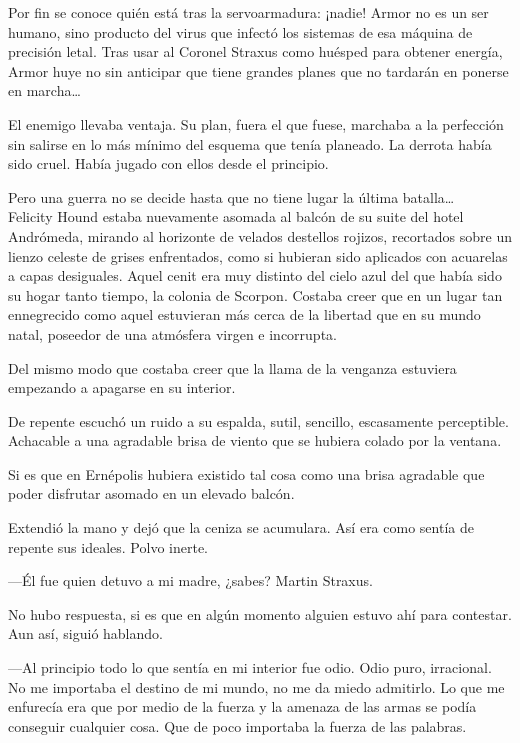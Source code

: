\begin{prev}
    Por fin se conoce quién está tras la servoarmadura: ¡nadie! Armor no es un ser humano, sino producto del virus que infectó los sistemas de esa máquina de precisión letal. Tras usar al Coronel Straxus como huésped para obtener energía, Armor huye no sin anticipar que tiene grandes planes que no tardarán en ponerse en marcha\dots
\end{prev}

\noindent{}El enemigo llevaba ventaja. Su plan, fuera el que fuese, marchaba a la perfección sin salirse en lo más mínimo del esquema que tenía planeado. La derrota había sido cruel. Había jugado con ellos desde el principio.

Pero una guerra no se decide hasta que no tiene lugar la última batalla\dots\\

\noindent{}Felicity Hound estaba nuevamente asomada al balcón de su suite del hotel Andrómeda, mirando al horizonte de velados destellos rojizos, recortados sobre un lienzo celeste de grises enfrentados, como si hubieran sido aplicados con acuarelas a capas desiguales. Aquel cenit era muy distinto del cielo azul del que había sido su hogar tanto tiempo, la colonia de Scorpon. Costaba creer que en un lugar tan ennegrecido como aquel estuvieran más cerca de la libertad que en su mundo natal, poseedor de una atmósfera virgen e incorrupta.

Del mismo modo que costaba creer que la llama de la venganza estuviera empezando a apagarse en su interior.

De repente escuchó un ruido a su espalda, sutil, sencillo, escasamente perceptible. Achacable a una agradable brisa de viento que se hubiera colado por la ventana.

Si es que en Ernépolis hubiera existido tal cosa como una brisa agradable que poder disfrutar asomado en un elevado balcón.

Extendió la mano y dejó que la ceniza se acumulara. Así era como sentía de repente sus ideales. Polvo inerte.

---Él fue quien detuvo a mi madre, ¿sabes? Martin Straxus.

No hubo respuesta, si es que en algún momento alguien estuvo ahí para contestar. Aun así, siguió hablando.

---Al principio todo lo que sentía en mi interior fue odio. Odio puro, irracional. No me importaba el destino de mi mundo, no me da miedo admitirlo. Lo que me enfurecía era que por medio de la fuerza y la amenaza de las armas se podía conseguir cualquier cosa. Que de poco importaba la fuerza de las palabras.

